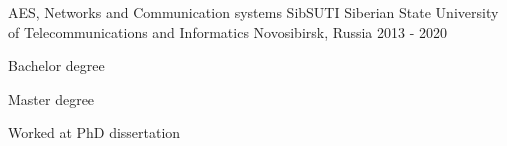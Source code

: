 

\begin{cventries}

  \cventry
    {AES, Networks and Communication systems} %
    {SibSUTI Siberian State University of Telecommunications and Informatics} %
    {Novosibirsk, Russia} %
    {2013 - 2020} %
    {
      \begin{cvitems} %
        \item {Bachelor degree}
        \item {Master degree}
        \item {Worked at PhD dissertation}
      \end{cvitems}
    }
\end{cventries}
